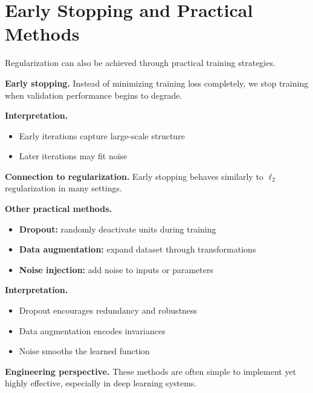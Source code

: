 \section{Early Stopping and Practical Methods}

Regularization can also be achieved through practical training strategies.

\medskip

\noindent
\textbf{Early stopping.}  
Instead of minimizing training loss completely, we stop training when validation performance begins to degrade.

\medskip

\noindent
\textbf{Interpretation.}
\begin{itemize}
    \item Early iterations capture large-scale structure
    \item Later iterations may fit noise
\end{itemize}

\medskip

\noindent
\textbf{Connection to regularization.}  
Early stopping behaves similarly to $\ell_2$ regularization in many settings.

\medskip

\noindent
\textbf{Other practical methods.}

\begin{itemize}
    \item \textbf{Dropout:} randomly deactivate units during training
    \item \textbf{Data augmentation:} expand dataset through transformations
    \item \textbf{Noise injection:} add noise to inputs or parameters
\end{itemize}

\medskip

\noindent
\textbf{Interpretation.}
\begin{itemize}
    \item Dropout encourages redundancy and robustness
    \item Data augmentation encodes invariances
    \item Noise smooths the learned function
\end{itemize}

\medskip

\noindent
\textbf{Engineering perspective.}  
These methods are often simple to implement yet highly effective, especially in deep learning systems.

